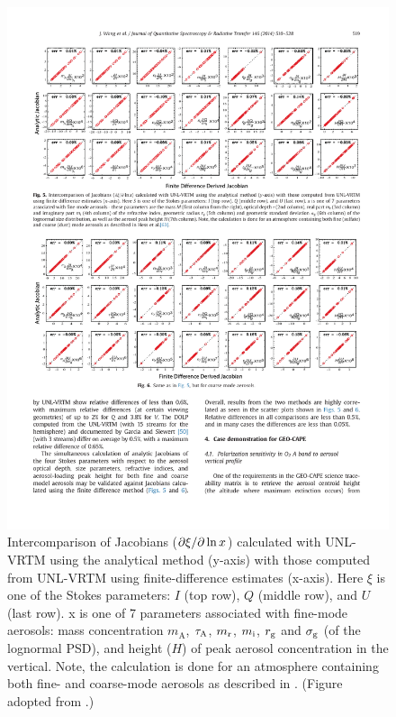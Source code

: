 \begin{landscape}
\begin{figure}[p]
  \centering
  \includegraphics[width={1.4\textwidth}]{figures/unlvrtm4.pdf}
  \caption{Intercomparison of Jacobians ($\partial\xi/\partial\ln{x}$) 
calculated with UNL-VRTM using the analytical method (y-axis) with 
those computed from UNL-VRTM using finite-difference estimates (x-axis). 
Here $\xi$ is one of the Stokes parameters: $I$ (top row), $Q$
(middle row), and $U$ (last row). x is one of 7 parameters associated 
with fine-mode aerosols: mass concentration $m_\text{A}$, $\tau_\text{A}$,
$m_\text{r}$, $m_\text{i}$, $r_\text{g}$ and $\sigma_\text{g}$ (of the lognormal PSD), and height
($H$) of peak aerosol concentration in the vertical. Note,
the calculation is done for an atmosphere containing both fine- 
and coarse-mode aerosols as described in \citet{Hess98}.
(Figure adopted from \citet{Wang14}.)}
  \label{fig:unlvrtm4}
\end{figure}
\end{landscape}

